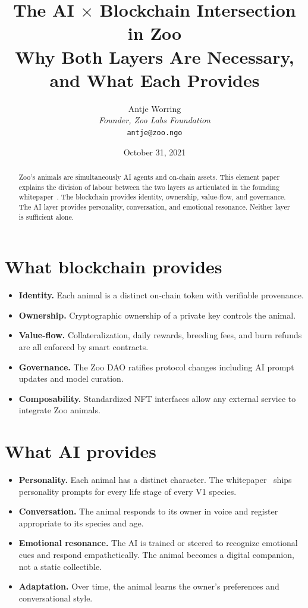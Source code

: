 \documentclass[11pt,letterpaper]{article}
\title{\textbf{The AI \texorpdfstring{$\times$}{x} Blockchain Intersection in Zoo}\\\large Why Both Layers Are Necessary, and What Each Provides}
\author{Antje Worring \\ \textit{Founder, Zoo Labs Foundation} \\ \texttt{antje@zoo.ngo}}
\date{October 31, 2021}
\begin{document}
\maketitle

\begin{abstract}
Zoo's animals are simultaneously AI agents and on-chain assets. This element paper explains the division of labour between the two layers as articulated in the founding whitepaper~\cite{zoo2021}. The blockchain provides identity, ownership, value-flow, and governance. The AI layer provides personality, conversation, and emotional resonance. Neither layer is sufficient alone.
\end{abstract}

\section{What blockchain provides}

\begin{itemize}
  \item \textbf{Identity.} Each animal is a distinct on-chain token with verifiable provenance.
  \item \textbf{Ownership.} Cryptographic ownership of a private key controls the animal.
  \item \textbf{Value-flow.} Collateralization, daily rewards, breeding fees, and burn refunds are all enforced by smart contracts.
  \item \textbf{Governance.} The Zoo DAO ratifies protocol changes including AI prompt updates and model curation.
  \item \textbf{Composability.} Standardized NFT interfaces allow any external service to integrate Zoo animals.
\end{itemize}

\section{What AI provides}

\begin{itemize}
  \item \textbf{Personality.} Each animal has a distinct character. The whitepaper~\cite{zoo2021} ships personality prompts for every life stage of every V1 species.
  \item \textbf{Conversation.} The animal responds to its owner in voice and register appropriate to its species and age.
  \item \textbf{Emotional resonance.} The AI is trained or steered to recognize emotional cues and respond empathetically. The animal becomes a digital companion, not a static collectible.
  \item \textbf{Adaptation.} Over time, the animal learns the owner's preferences and conversational style.
\end{itemize}
\end{document}
